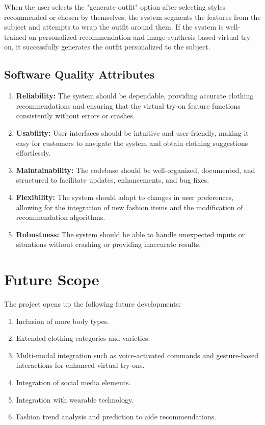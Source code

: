 		When the user selects the "generate outfit" option after selecting styles recommended or chosen by themselves, the system segments the features from the subject and attempts to wrap the outfit around them. If the system is well-trained on personalized recommendation and image synthesis-based virtual try-on, it successfully generates the outfit personalized to the subject.

	\subsection{Software Quality Attributes}
		\begin{enumerate}
			\item \textbf{Reliability:} The system should be dependable, providing accurate clothing recommendations and ensuring that the virtual try-on feature functions consistently without errors or crashes.
			\item \textbf{Usability:} User interfaces should be intuitive and user-friendly, making it easy for customers to navigate the system and obtain clothing suggestions effortlessly.
			\item \textbf{Maintainability:} The codebase should be well-organized, documented, and structured to facilitate updates, enhancements, and bug fixes.
			\item \textbf{Flexibility:} The system should adapt to changes in user preferences, allowing for the integration of new fashion items and the modification of recommendation algorithms.
			\item \textbf{Robustness:} The system should be able to handle unexpected inputs or situations without crashing or providing inaccurate results.
		\end{enumerate}

\section{Future Scope}
	The project opens up the following future developments:

	\begin{enumerate}
		\item Inclusion of more body types.
		\item Extended clothing categories and varieties.
		\item Multi-modal integration such as voice-activated commands and gesture-based interactions for enhanced virtual try-ons.
		\item Integration of social media elements.
		\item Integration with wearable technology.
		\item Fashion trend analysis and prediction to aide recommendations.
	\end{enumerate}